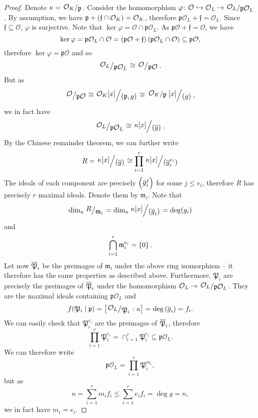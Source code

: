 \begin{proof}
Denote $\kappa = \kvoc{\mathcal{O}_K}{\mathfrak{p}}$. Consider the
homomorphism
$\varphi \colon \mathcal{O} \hookrightarrow
\mathcal{O}_L \to
\kvoc{\mathcal{O}_L}{\mathfrak{p} \mathcal{O}_L}$. By assumption,
we have
$\mathfrak{p} + \left(\mathfrak{f} \cap \mathcal{O}_K\right) =
\mathcal{O}_K$, therefore
$\mathfrak{p} \mathcal{O}_L + \mathfrak{f} = \mathcal{O}_L$.
Since $\mathfrak{f} \subseteq \mathcal{O}$, $\varphi$ is
surjective. Note that
$\ker \varphi = \mathcal{O} \cap \mathfrak{p} \mathcal{O}_L$. As
$\mathfrak{p} \mathcal{O} + \mathfrak{f} = \mathcal{O}$, we have
\[
\ker \varphi =
\mathfrak{p} \mathcal{O}_L \cap \mathcal{O} =
\left(\mathfrak{p} \mathcal{O} + \mathfrak{f}\right)
\left(\mathfrak{p} \mathcal{O}_L \cap \mathcal{O}\right) \subseteq
\mathfrak{p} \mathcal{O},
\]
therefore $\ker \varphi = \mathfrak{p} \mathcal{O}$ and so
\[
\kvoc{\mathcal{O}_L}{\mathfrak{p} \mathcal{O}_L} \cong
\kvoc{\mathcal{O}}{\mathfrak{p} \mathcal{O}}.
\]
But as
\[
\kvoc{\mathcal{O}}{\mathfrak{p} \mathcal{O}} \cong
\kvoc{\mathcal{O}_K[x]}{(\mathfrak{p}, g)} \cong
\kvoc{\kvoc{\mathcal{O}_K}{\mathfrak{p}}[x]}{(g)},
\]
we in fact have
\[
\kvoc{\mathcal{O}_L}{\mathfrak{p} \mathcal{O}_L} \cong
\kvoc{\kappa[x]}{\br{\oline{g}}}.
\]
By the Chinese remainder theorem, we can further write
\[
R = \kvoc{\kappa[x]}{\br{\oline{g}}} \cong
\prod_{i=1}^r \kvoc{\kappa[x]}{\br{\oline{g}_i^{e_i}}}
\]
The ideals of each component are precisely $\left(\overline{g}_i^j\right)$ for
some $j \leq e_i$, therefore $R$ has precisely $r$ maximal ideals.
Denote them by $\mathfrak{m}_i$. Note that
\[
\dim_\kappa \kvoc{R}{\mathfrak{m}_i} =
\dim_\kappa \kvoc{\kappa[x]}{\br{\oline{g}_i}} =
\deg(g_i)
\]
and
\[
\bigcap_{i=1}^r \mathfrak{m}_i^{e_i} = \left\{0\right\}.
\]
Let now $\overline{\mathfrak{P}}_i$ be the preimages of
$\mathfrak{m}_i$ under the above ring isomorphism -- it therefore
has the same properties as described above. Furthermore,
$\mathfrak{P}_i$ are precisely the preimages of
$\overline{\mathfrak{P}}_i$ under the homomorphism
$\mathcal{O}_L \to
\kvoc{\mathcal{O}_L}{\mathfrak{p} \mathcal{O}_L}$. They are the
maximal ideals containing $\mathfrak{p} \mathcal{O}_L$ and
\[
f(\mathfrak{P}_i \mid \mathfrak{p}) =
\left[\kvoc{\mathcal{O}_L}{\mathfrak{P}_i} : \kappa \right] =
\deg \br{\oline{g}_i} =
f_i.
\]
We can easily check that $\mathfrak{P}_i^{e_i}$ are the preimages
of $\overline{\mathfrak{P}}_i$, therefore
\[
\prod_{i=1}^r \mathfrak{P}_i^{e_i} =
\cap_{i=1}^r \mathfrak{P}_i^{e_i} \subseteq
\mathfrak{p} \mathcal{O}_L.
\]
We can therefore write
\[
\mathfrak{p} \mathcal{O}_L =
\prod_{i=1}^r \mathfrak{P}_i^{m_i},
\]
but as
\[
n = \sum_{i=1}^r m_i f_i \leq \sum_{i=1}^r e_i f_i = \deg g = n,
\]
we in fact have $m_i = e_i$.
\end{proof}

